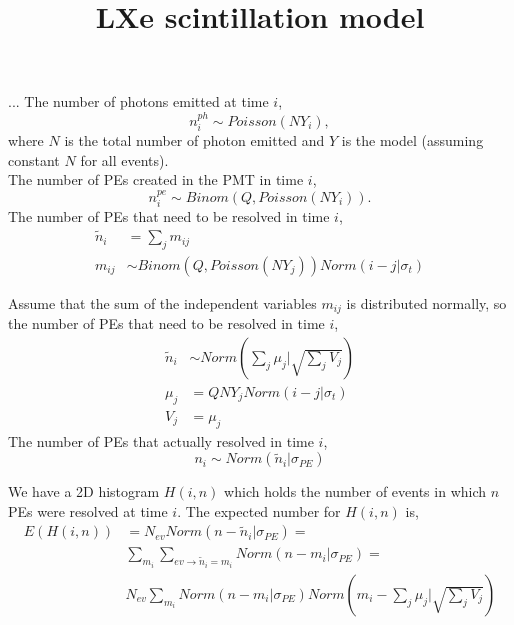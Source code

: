 \documentclass{beamer}
\title{LXe scintillation model}
\begin{document}
{ 
\frame{\titlepage}}

\begin{frame}{...}
The number of photons emitted at time $i$,
\begin{equation}
n_i^{ph}\sim Poisson(NY_i),
\end{equation}
where $N$ is the total number of photon emitted and $Y$ is the model (assuming constant $N$ for all events).\\
The number of PEs created in the PMT in time $i$,
\begin{equation}
n_i^{pe}\sim Binom(Q, Poisson(NY_i)).
\end{equation}
The number of PEs that need to be resolved in time $i$,
\begin{equation}
\begin{split}
\tilde n_i&=\sum_j m_{ij}\\
m_{ij}&\sim Binom(Q, Poisson(NY_j))Norm(i-j|\sigma_t)
\end{split}
\end{equation}
\end{frame}

\begin{frame}
Assume that the sum of the independent variables $m_{ij}$ is distributed normally, so the number of PEs that need to be resolved in time $i$,
\begin{equation}
\begin{split}
\tilde n_i&\sim Norm\left(\sum_j \mu_j\bigg|\sqrt{\sum_j V_j}\right)\\
\mu_j&=QNY_jNorm(i-j|\sigma_t)\\
V_j&=\mu_j
\end{split}
\end{equation}
The number of PEs that actually resolved in time $i$,
\begin{equation}
n_i\sim Norm(\tilde n_i|\sigma_{PE})
\end{equation}
\end{frame}

\begin{frame}
We have a 2D histogram $H(i,n)$ which holds the number of events in which $n$ PEs were resolved at time $i$. The expected number for $H(i,n)$ is,
\begin{equation}
\begin{split}
E(H(i,n))&=N_{ev}Norm(n-\tilde n_i|\sigma_{PE})=\\
&\sum_{m_i}\sum_{ev\rightarrow \tilde n_i=m_i}Norm(n-m_i|\sigma_{PE})=\\
&N_{ev}\sum_{m_i}Norm(n-m_i|\sigma_{PE})Norm(m_i-\sum_j\mu_j\big|\sqrt{\sum_j V_j})
\end{split}
\end{equation}
\end{frame}
\end{document}
